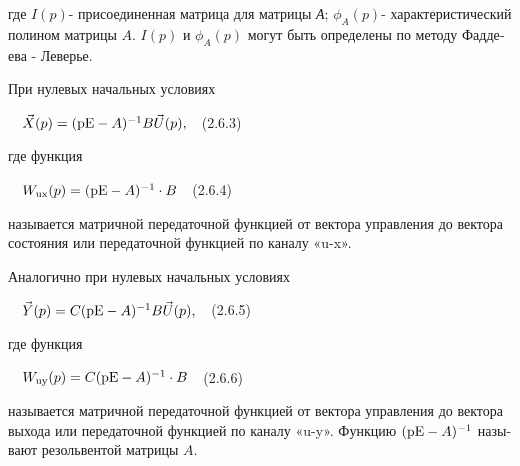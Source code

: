 \documentclass[a4paper]{article}
\newcommand\normalsubformula[1]{\text{\mathversion{normal}$#1$}}
\begin{document}
{\begin{russian}\sffamily
где  $I(p)$- присоединенная матрица для матрицы \textit{А};  $ϕ_A(p)$- характеристический полином матрицы  $A$.  $I(p)$
и  $ϕ_A(p)$ могут быть определены по методу Фаддеева - Леверье.
\end{russian}}

{\begin{russian}\sffamily
При нулевых начальных условиях
\end{russian}}

{\begin{russian}\sffamily
\ \  $\vec X(p)=(\normalsubformula{\text{pE}}-A)^{-1}B\vec U(p),$\ \ (2.6.3)
\end{russian}}

{\begin{russian}\sffamily
где функция
\end{russian}}

{\begin{russian}\sffamily
\ \  $W_{\normalsubformula{\text{ux}}}(p)=(\normalsubformula{\text{pE}}-A)^{-1}\cdot B$\ \ (2.6.4)
\end{russian}}

{\begin{russian}\sffamily
называется матричной передаточной функцией от вектора управления до вектора состояния или передаточной функцией по
каналу «\textenglish{u}-\textenglish{x}».
\end{russian}}

{\begin{russian}\sffamily
Аналогично при нулевых начальных условиях
\end{russian}}

{\begin{russian}\sffamily
\ \  $\vec Y(p)=C(\normalsubformula{\text{pE}}-A)^{-1}B\vec U(p),$\ \ (2.6.5)
\end{russian}}

{\begin{russian}\sffamily
где функция
\end{russian}}

{\begin{russian}\sffamily
\ \  $W_{\normalsubformula{\text{uy}}}(p)=C(\normalsubformula{\text{pE}}-A)^{-1}\cdot B$\ \ (2.6.6)
\end{russian}}

{\begin{russian}\sffamily
называется матричной передаточной функцией от вектора управления до вектора выхода или передаточной функцией по каналу
«\textenglish{u}-\textenglish{y}». Функцию  $(\normalsubformula{\text{pE}}-A)^{-1}$ называют резольвентой матрицы  $A$.
\end{russian}}
\end{document}
